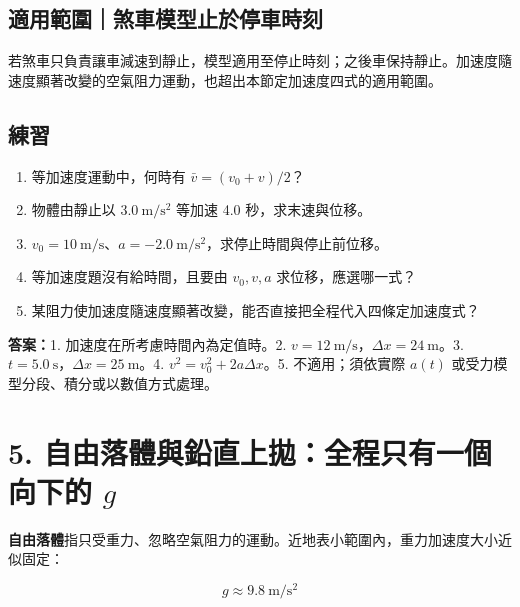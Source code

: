 \documentclass[11pt,a4paper]{article}
\providecommand{\tightlist}{%
  \setlength{\itemsep}{0pt}\setlength{\parskip}{0pt}}
\begin{document}
\subsection{適用範圍｜煞車模型止於停車時刻}\label{ux9069ux7528ux7bc4ux570dux715eux8ecaux6a21ux578bux6b62ux65bcux505cux8ecaux6642ux523b}

若煞車只負責讓車減速到靜止，模型適用至停止時刻；之後車保持靜止。加速度隨速度顯著改變的空氣阻力運動，也超出本節定加速度四式的適用範圍。

\begin{HandoutSelfCheck}

\subsection{練習}\label{ux7df4ux7fd2-3}

\begin{enumerate}
\def\labelenumi{\arabic{enumi}.}
\tightlist
\item
  等加速度運動中，何時有 \(\bar v=(v_0+v)/2\)？
\item
  物體由靜止以 \(3.0\ \mathrm{m/s^2}\) 等加速 4.0 秒，求末速與位移。
\item
  \(v_0=10\ \mathrm{m/s}\)、\(a=-2.0\ \mathrm{m/s^2}\)，求停止時間與停止前位移。
\item
  等加速度題沒有給時間，且要由 \(v_0,v,a\) 求位移，應選哪一式？
\item
  某阻力使加速度隨速度顯著改變，能否直接把全程代入四條定加速度式？
\end{enumerate}

\textbf{答案：}1. 加速度在所考慮時間內為定值時。2. \(v=12\ \mathrm{m/s}\)，\(\Delta x=24\ \mathrm m\)。3. \(t=5.0\ \mathrm s\)，\(\Delta x=25\ \mathrm m\)。4. \(v^2=v_0^2+2a\Delta x\)。5. 不適用；須依實際 \(a(t)\) 或受力模型分段、積分或以數值方式處理。

\end{HandoutSelfCheck}

\section{\texorpdfstring{5. 自由落體與鉛直上拋：全程只有一個向下的 \(g\)}{5. 自由落體與鉛直上拋：全程只有一個向下的 g}}\label{ux81eaux7531ux843dux9ad4ux8207ux925bux76f4ux4e0aux62cbux5168ux7a0bux53eaux6709ux4e00ux500bux5411ux4e0bux7684-g}

\textbf{自由落體}指只受重力、忽略空氣阻力的運動。近地表小範圍內，重力加速度大小近似固定：

\[
g\approx9.8\ \mathrm{m/s^2}
\]
\end{document}
